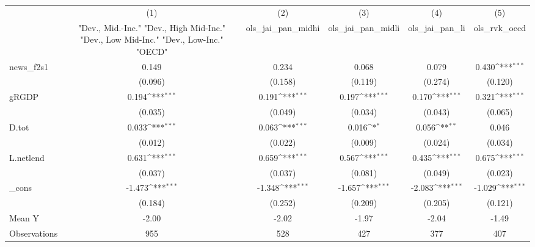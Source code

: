 {
\def\sym#1{\ifmmode^{#1}\else\(^{#1}\)\fi}
\begin{tabular}{l*{5}{c}}
\toprule
            &\multicolumn{1}{c}{(1)}&\multicolumn{1}{c}{(2)}&\multicolumn{1}{c}{(3)}&\multicolumn{1}{c}{(4)}&\multicolumn{1}{c}{(5)}\\
            &\multicolumn{1}{c}{ "Dev., Mid.-Inc." "Dev., High Mid-Inc." "Dev., Low Mid-Inc." "Dev., Low-Inc." "OECD" }&\multicolumn{1}{c}{ols\_jai\_pan\_midhi}&\multicolumn{1}{c}{ols\_jai\_pan\_midli}&\multicolumn{1}{c}{ols\_jai\_pan\_li}&\multicolumn{1}{c}{ols\_rvk\_oecd}\\
\midrule
news\_f2s1   &       0.149         &       0.234         &       0.068         &       0.079         &       0.430\sym{***}\\
            &     (0.096)         &     (0.158)         &     (0.119)         &     (0.274)         &     (0.120)         \\
\addlinespace
gRGDP       &       0.194\sym{***}&       0.191\sym{***}&       0.197\sym{***}&       0.170\sym{***}&       0.321\sym{***}\\
            &     (0.035)         &     (0.049)         &     (0.034)         &     (0.043)         &     (0.065)         \\
\addlinespace
D.tot       &       0.033\sym{***}&       0.063\sym{***}&       0.016\sym{*}  &       0.056\sym{**} &       0.046         \\
            &     (0.012)         &     (0.022)         &     (0.009)         &     (0.024)         &     (0.034)         \\
\addlinespace
L.netlend   &       0.631\sym{***}&       0.659\sym{***}&       0.567\sym{***}&       0.435\sym{***}&       0.675\sym{***}\\
            &     (0.037)         &     (0.037)         &     (0.081)         &     (0.049)         &     (0.023)         \\
\addlinespace
\_cons      &      -1.473\sym{***}&      -1.348\sym{***}&      -1.657\sym{***}&      -2.083\sym{***}&      -1.029\sym{***}\\
            &     (0.184)         &     (0.252)         &     (0.209)         &     (0.205)         &     (0.121)         \\
\midrule
Mean Y      &       -2.00         &       -2.02         &       -1.97         &       -2.04         &       -1.49         \\
Observations&         955         &         528         &         427         &         377         &         407         \\
\bottomrule
\end{tabular}
}
